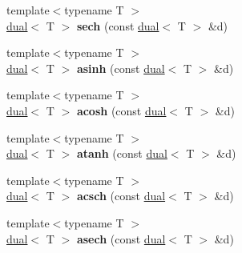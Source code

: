 \begin{DoxyCompactItemize}
\item 
\hypertarget{namespace_d_r_d_s_p_aad69e073ac4776c14081ea6542927b5f}{{\footnotesize template$<$typename T $>$ }\\\hyperlink{struct_d_r_d_s_p_1_1dual}{dual}$<$ T $>$ {\bfseries sech} (const \hyperlink{struct_d_r_d_s_p_1_1dual}{dual}$<$ T $>$ \&d)}\label{namespace_d_r_d_s_p_aad69e073ac4776c14081ea6542927b5f}

\item 
\hypertarget{namespace_d_r_d_s_p_a6618f3fdf2d784119744176043dfc2eb}{{\footnotesize template$<$typename T $>$ }\\\hyperlink{struct_d_r_d_s_p_1_1dual}{dual}$<$ T $>$ {\bfseries asinh} (const \hyperlink{struct_d_r_d_s_p_1_1dual}{dual}$<$ T $>$ \&d)}\label{namespace_d_r_d_s_p_a6618f3fdf2d784119744176043dfc2eb}

\item 
\hypertarget{namespace_d_r_d_s_p_ad36ff16d3877d7ec11a97f1acd909390}{{\footnotesize template$<$typename T $>$ }\\\hyperlink{struct_d_r_d_s_p_1_1dual}{dual}$<$ T $>$ {\bfseries acosh} (const \hyperlink{struct_d_r_d_s_p_1_1dual}{dual}$<$ T $>$ \&d)}\label{namespace_d_r_d_s_p_ad36ff16d3877d7ec11a97f1acd909390}

\item 
\hypertarget{namespace_d_r_d_s_p_ae3e3962e2b5ba30e10dd274a79bd9a4b}{{\footnotesize template$<$typename T $>$ }\\\hyperlink{struct_d_r_d_s_p_1_1dual}{dual}$<$ T $>$ {\bfseries atanh} (const \hyperlink{struct_d_r_d_s_p_1_1dual}{dual}$<$ T $>$ \&d)}\label{namespace_d_r_d_s_p_ae3e3962e2b5ba30e10dd274a79bd9a4b}

\item 
\hypertarget{namespace_d_r_d_s_p_a0e78e0aa5f7f95be037ac0867241f42b}{{\footnotesize template$<$typename T $>$ }\\\hyperlink{struct_d_r_d_s_p_1_1dual}{dual}$<$ T $>$ {\bfseries acsch} (const \hyperlink{struct_d_r_d_s_p_1_1dual}{dual}$<$ T $>$ \&d)}\label{namespace_d_r_d_s_p_a0e78e0aa5f7f95be037ac0867241f42b}

\item 
\hypertarget{namespace_d_r_d_s_p_ab0e1c734f9d9cb083a6eed712b673692}{{\footnotesize template$<$typename T $>$ }\\\hyperlink{struct_d_r_d_s_p_1_1dual}{dual}$<$ T $>$ {\bfseries asech} (const \hyperlink{struct_d_r_d_s_p_1_1dual}{dual}$<$ T $>$ \&d)}\label{namespace_d_r_d_s_p_ab0e1c734f9d9cb083a6eed712b673692}


\end{DoxyCompactItemize}
